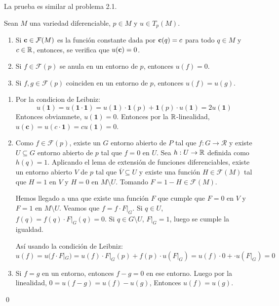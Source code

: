\documentclass[Cursovd_portada.tex]{subfiles}
\begin{document}
\begin{dem}
La prueba es similar al problema 2.1.
\end{dem}
\begin{lemma}\label{lema3.2} Sean $M$ una variedad diferenciable, $p\in M$ y $u\in T_p(M)$.
\begin{enumerate}
\item Si ${\bf c}\in{\cal F}(M)$ es la función constante dada por ${\bf c}(q)=c$ para todo $q\in M$ y $c\in\mathbb{R}$,
entonces, se verifica que $u({\bf c})=0$.
\item Si $f\in\mathcal{F}(p)$ se anula en un entorno de $p$, entonces $u(f)=0$.
\item Si $f,g\in\mathcal{F}(p)$ coinciden en un entorno de $p$, entonces $u(f)=u(g)$.
\end{enumerate}
\end{lemma}
\begin{dem}\mbox{}
\begin{enumerate}
	\item Por la condicion de Leibniz: 
	\[ u(\mathbf{1})=u(\mathbf{1}\cdot \mathbf{1}) = u(\mathbf{1}) \cdot \mathbf{1}(p) + \mathbf{1}(p) \cdot u(\mathbf{1}) = 2 u(\mathbf{1}) \]
	Entonces obviamnete, $u(\mathbf{1})=0$. Entonces por la $\mathbb{R}$-linealidad, $u(\mathbf{c})=u(c\cdot\mathbf{1})=c u(\mathbf{1}) = 0$.
	\item Como $f \in \mathcal{F}(p)$, existe un $G$ entorno abierto de $P$ tal que $f : G \to \mathcal{R}$ y existe $U\subseteq G$ entorno abierto de $p$ tal que $f=0$ en $U$. Sea $h : U \to \mathbb{R}$ definida como $h(q)=1$. Aplicando el lema de extensión de funciones diferenciables, existe un entorno abierto $V$ de $p$ tal que $\overline{V}\subseteq U$ y existe una función $H \in \mathcal{F}(M)$ tal que $H=1$ en $V$ y $H=0$ en $M \setminus U$. Tomando $F=1-H \in \mathcal{F}(M)$.

	Hemos llegado a una que existe una función $F$ que cumple que $F=0$ en $V$ y $F=1$ en $M\setminus U$. Veamos que $f=f\cdot F|_G$. Si $q \in U$, $f(q)=f(q)\cdot F|_G(q)=0$. Si $q \in G\setminus U$, $F|_G=1$, luego se cumple la igualdad.
	
	Así usando la condición de Leibniz:
	\[ u(f)=u(f \cdot F|_G)=u(f)\cdot F|_G(p)+f(p)\cdot u(F|_G) = u(f) \cdot 0 +  \cdot u(F|_G) = 0\]
	\item Si $f=g$ en un entorno, entonces $f-g=0$ en ese entorno. Luego por la linealidad, $0=u(f-g)=u(f)-u(g)$, Entonces $u(f)=u(g)$. 
\end{enumerate}
\qed
\end{dem}
\end{document}
